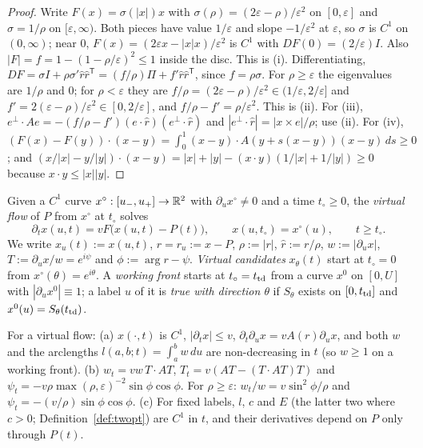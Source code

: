 \begin{proof}
Write $F(x)=\sigma(|x|)x$ with $\sigma(\rho)=(2\varepsilon-\rho)/\varepsilon^2$ on $[0,\varepsilon]$ and $\sigma=1/\rho$ on
$[\varepsilon,\infty)$. Both pieces have value $1/\varepsilon$ and slope $-1/\varepsilon^2$ at $\varepsilon$, so $\sigma$ is
$C^1$ on $(0,\infty)$; near $0$, $F(x)=(2\varepsilon x-|x|x)/\varepsilon^2$ is $C^1$ with $DF(0)=(2/\varepsilon)I$. Also
$|F|=f=1-(1-\rho/\varepsilon)^2\le1$ inside the disc. This is (i). Differentiating, $DF=\sigma I+\rho\sigma'\hat r\hat
r^{\mathsf T}=(f/\rho)\Pi+f'\hat r\hat r^{\mathsf T}$, since $f=\rho\sigma$. For $\rho\ge\varepsilon$ the eigenvalues are
$1/\rho$ and $0$; for $\rho<\varepsilon$ they are $f/\rho=(2\varepsilon-\rho)/\varepsilon^2\in(1/\varepsilon,2/\varepsilon]$ and
$f'=2(\varepsilon-\rho)/\varepsilon^2\in[0,2/\varepsilon]$, and $f/\rho-f'=\rho/\varepsilon^2$. This is (ii). For (iii),
$e^\perp\cdot Ae=-(f/\rho-f')(e\cdot\hat r)(e^\perp\cdot\hat r)$ and $|e^\perp\cdot\hat r|=|x\times e|/\rho$; use (ii).
For (iv), $(F(x)-F(y))\cdot(x-y)=\int_0^1(x-y)\cdot A(y+s(x-y))(x-y)\,ds\ge0$; and
$(x/|x|-y/|y|)\cdot(x-y)=|x|+|y|-(x\cdot y)(1/|x|+1/|y|)\ge0$ because $x\cdot y\le|x||y|$.
\end{proof}

\begin{definition}\label{def:vflow}
Given a $C^1$ curve $x^\circ:[u_-,u_+]\to\mathbb{R}^2$ with $\partial_ux^\circ\ne0$ and a time $t_\circ\ge0$, the
\emph{virtual flow} of $P$ from $x^\circ$ at $t_\circ$ solves
\[
\partial_tx(u,t)=vF\bigl(x(u,t)-P(t)\bigr),\qquad x(u,t_\circ)=x^\circ(u),\qquad t\ge t_\circ .
\]
We write $x_u(t):=x(u,t)$, $r=r_u:=x-P$, $\rho:=|r|$, $\hat r:=r/\rho$, $w:=|\partial_ux|$,
$T:=\partial_ux/w=e^{i\psi}$ and $\phi:=\arg r-\psi$. \emph{Virtual candidates} $x_\theta(t)$ start at $t_\circ=0$ from
$x^\circ(\theta)=e^{i\theta}$. A \emph{working front} starts at $t_\circ=t_{\mathrm{td}}$ from a curve $x^0$ on $[0,U]$ with
$|\partial_ux^0|\equiv1$; a label $u$ of it is \emph{true with direction $\theta$} if $S_\theta$ exists on $[0,t_{\mathrm{td}}]$
and $x^0(u)=S_\theta(t_{\mathrm{td}})$.
\end{definition}

\begin{lemma}\label{lem:vflow}
For a virtual flow:
\textup{(a)} $x(\cdot,t)$ is $C^1$, $|\partial_tx|\le v$, $\partial_t\partial_ux=vA(r)\partial_ux$, and both $w$ and
the arclengths $l(a,b;t)=\int_a^bw\,du$ are non-decreasing in $t$ \textup(so $w\ge1$ on a working front\textup).
\textup{(b)} $w_t=vw\,T\cdot AT$, $T_t=v(AT-(T\cdot AT)T)$ and
$\psi_t=-v\rho\max(\rho,\varepsilon)^{-2}\sin\phi\cos\phi$. For $\rho\ge\varepsilon$: $w_t/w=v\sin^2\phi/\rho$ and
$\psi_t=-(v/\rho)\sin\phi\cos\phi$.
\textup{(c)} For fixed labels, $l$, $c$ and $E$ \textup(the latter two where $c>0$; Definition~\ref{def:twopt}\textup)
are $C^1$ in $t$, and their derivatives depend on $P$ only through $P(t)$.
\end{lemma}

